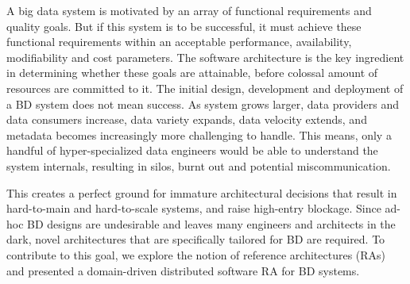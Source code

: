 \documentclass[runningheads]{llncs}
\begin{document}



A big data system is motivated by an array of functional requirements and quality goals. But if this system is to be successful, it must achieve these functional requirements within an acceptable performance, availability, modifiability and cost parameters. The software architecture is the key ingredient in determining whether these goals are attainable, before colossal amount of resources are committed to it. The initial design, development and deployment of a BD system does not mean success. As system grows larger, data providers and data consumers increase, data variety expands, data velocity extends, and metadata becomes increasingly more challenging to handle. This means, only a handful of hyper-specialized data engineers would be able to understand the system internals, resulting in silos, burnt out and potential miscommunication. 

This creates a perfect ground for immature architectural decisions that result in hard-to-main and hard-to-scale systems, and raise high-entry blockage. Since ad-hoc BD designs are undesirable and leaves many engineers and architects in the dark, novel architectures that are specifically tailored for BD are required. To contribute to this goal, we explore the notion of reference architectures (RAs) and presented a domain-driven distributed software RA for BD systems.
\end{document}
